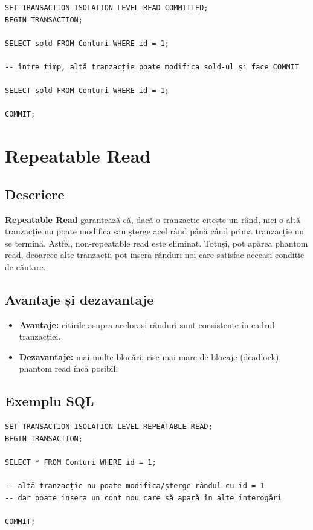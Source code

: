 \documentclass[11pt,a4paper]{article}
\begin{document}
\begin{verbatim}
SET TRANSACTION ISOLATION LEVEL READ COMMITTED;
BEGIN TRANSACTION;

SELECT sold FROM Conturi WHERE id = 1;

-- între timp, altă tranzacție poate modifica sold-ul și face COMMIT

SELECT sold FROM Conturi WHERE id = 1;

COMMIT;
\end{verbatim}

\section{Repeatable Read}

\subsection{Descriere}

\textbf{Repeatable Read} garantează că, dacă o tranzacție citește un rând, nici o altă tranzacție nu poate modifica sau șterge acel rând până când prima tranzacție nu se termină. Astfel, non-repeatable read este eliminat. Totuși, pot apărea phantom read, deoarece alte tranzacții pot insera rânduri noi care satisfac aceeași condiție de căutare.

\subsection{Avantaje și dezavantaje}

\begin{itemize}[leftmargin=1.5cm]
  \item \textbf{Avantaje:} citirile asupra acelorași rânduri sunt consistente în cadrul tranzacției.
  \item \textbf{Dezavantaje:} mai multe blocări, risc mai mare de blocaje (deadlock), phantom read încă posibil.
\end{itemize}

\subsection{Exemplu SQL}

\begin{verbatim}
SET TRANSACTION ISOLATION LEVEL REPEATABLE READ;
BEGIN TRANSACTION;

SELECT * FROM Conturi WHERE id = 1;

-- altă tranzacție nu poate modifica/șterge rândul cu id = 1
-- dar poate insera un cont nou care să apară în alte interogări

COMMIT;
\end{verbatim}
\end{document}
